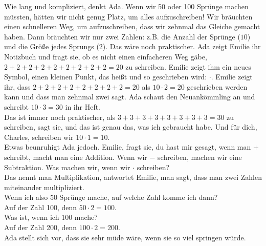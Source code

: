 Wie lang und kompliziert, denkt Ada. 
Wenn wir 50 oder 100 Sprünge machen müssten, hätten wir nicht genug Platz, um alles aufzuschreiben! 
Wir bräuchten einen schnelleren Weg, um aufzuschreiben, dass wir zehnmal das Gleiche gemacht haben. Dann bräuchten wir nur zwei Zahlen: z.B. die Anzahl der Sprünge ($10$) und die Größe jedes Sprungs ($2$). Das wäre noch praktischer. 
Ada zeigt Emilie ihr Notizbuch und fragt sie, ob es nicht einen einfacheren Weg gäbe, $2+2+2+2+2+2+2+2+2=20$ zu schreiben. Emilie zeigt ihm ein neues Symbol, einen kleinen Punkt, das  heißt und so geschrieben wird: $\cdot$. Emilie zeigt ihr, dass $2+2+2+2+2+2+2+2=20$ als $10 \cdot 2 = 20$ geschrieben werden kann und dass man zehnmal zwei sagt.
Ada schaut den Neuankömmling an und schreibt $10 \cdot 3 = 30 $ in ihr Heft. 
\\
\frqq{}Das ist immer noch praktischer, als $3+3+3+3+3+3+3+3=30$ zu schreiben\flqq{}, sagt sie, \frqq{}und das ist genau das, was ich gebraucht habe. Und für dich, Charles, schreiben wir $10 \cdot 1 = $10.\flqq{}\\
Etwas beunruhigt Ada jedoch. 
\frqq{}Emilie\flqq{}, fragt sie, \frqq{}du hast mir gesagt, wenn man $+$ schreibt, macht man eine Addition. Wenn wir $-$ schreiben, machen wir eine Subtraktion. Was machen wir, wenn wir $\cdot$ schreiben?\\
\frqq{}Das nennt man Multiplikation\flqq{}, antwortet Emilie, \frqq{}man sagt, dass man zwei Zahlen miteinander multipliziert.\\
\frqq{}Wenn ich also $50$ Sprünge mache, auf welche Zahl komme ich dann?\flqq{}\\
\frqq{}Auf der Zahl 100, denn $50 \cdot 2 = 100$.\flqq{}\\
\frqq{}Was ist, wenn ich $100$ mache?\flqq{}\\
\frqq{}Auf der Zahl 200, denn $100 \cdot 2 = 200$.\flqq{}\\
Ada stellt sich vor, dass sie sehr müde wäre, wenn sie so viel springen würde.
